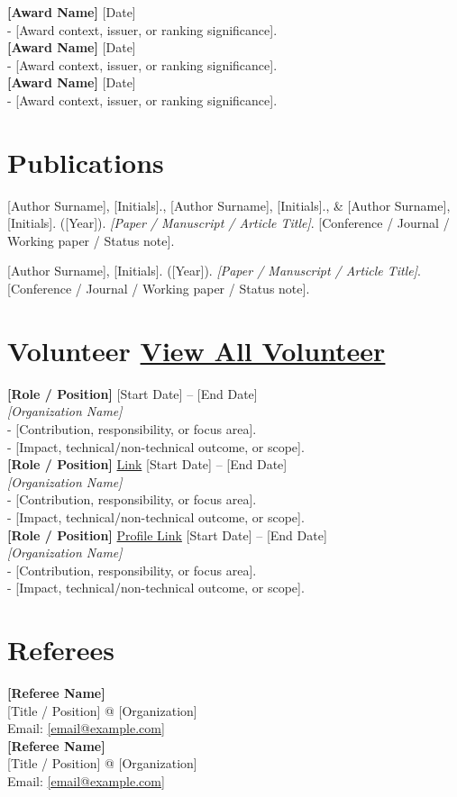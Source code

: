 \documentclass[10pt,letterpaper]{article}
\begin{document}
\textbf{[Award Name]} \hfill [Date] \\
- [Award context, issuer, or ranking significance]. \\

\textbf{[Award Name]} \hfill [Date] \\
- [Award context, issuer, or ranking significance]. \\

\textbf{[Award Name]} \hfill [Date] \\
- [Award context, issuer, or ranking significance].

\section*{Publications \hfill \footnotesize}

[Author Surname], [Initials]., [Author Surname], [Initials]., \& [Author Surname], [Initials]. ([Year]).
\textit{[Paper / Manuscript / Article Title]}.
{[Conference / Journal / Working paper / Status note].}

\vspace{0.5em}
[Author Surname], [Initials]. ([Year]).
\textit{[Paper / Manuscript / Article Title]}.
{[Conference / Journal / Working paper / Status note].}

\section*{Volunteer \hfill \footnotesize \href{https://www.linkedin.com/in/[linkedin-id]/details/volunteering-experiences/}{View All Volunteer}}

\textbf{[Role / Position]} \hfill [Start Date] -- [End Date] \\
\textit{[Organization Name]} \\
- [Contribution, responsibility, or focus area]. \\
- [Impact, technical/non-technical outcome, or scope]. \\

\textbf{[Role / Position]} \href{[organization-link]}{Link} \hfill [Start Date] -- [End Date] \\
\textit{[Organization Name]} \\
- [Contribution, responsibility, or focus area]. \\
- [Impact, technical/non-technical outcome, or scope]. \\

\textbf{[Role / Position]} \href{[profile-or-org-link]}{Profile Link} \hfill [Start Date] -- [End Date] \\
\textit{[Organization Name]} \\
- [Contribution, responsibility, or focus area]. \\
- [Impact, technical/non-technical outcome, or scope].

\section*{Referees}

\textbf{[Referee Name]} \\
{[Title / Position] @ [Organization]} \\
Email: \href{mailto:[email@example.com]}{[email@example.com]} \\

\textbf{[Referee Name]} \\
{[Title / Position] @ [Organization]} \\
Email: \href{mailto:[email@example.com]}{[email@example.com]}
\end{document}
